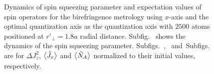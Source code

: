 \documentclass[preprint,aps,pra,onecolumn]{revtex4-1} %
\begin{document}
\begin{figure}
\begin{minipage}{.49\linewidth}
\end{minipage}
\begin{minipage}{.49\linewidth}
\centering
{}
\end{minipage}
\caption{Dynamics of spin squeezing parameter and expectation values of spin operators for the birefringence metrology using $ x $-axis and the optimal quantization axis as the quantization axis with $ 2500 $ atoms positioned at $ r'\!_\perp=1.8a $ radial distance. Subfig.~\protect{} shows the dynamics of the spin squeezing parameter. Subfigs.~\protect{},~\protect{} and~Subfigs.~\protect{} are for $ \Delta J_z^2 $, $ \big\langle \hat{J}_x \big\rangle $ and $ \big\langle \hat{N}_A \big\rangle $ normalized to their initial values, respectively. }\label{fig:clockdynamics_q_r1d8a}
\end{figure}
\end{document}
